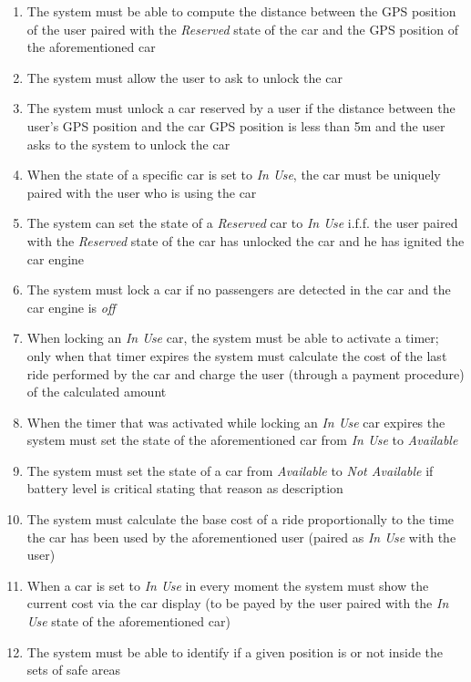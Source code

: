 \begin{description}
\begin{enumerate}[resume*]
  				\item The system must be able to compute the distance between the GPS position of
  				the user paired	with the \emph{Reserved} state of the car and the GPS position of the
  				aforementioned car
  				\item The system must allow the user to ask to unlock the car
  				\item The system must unlock a car reserved by a user if the distance between the user's GPS position and the car GPS position is less than 5m and the user asks to the system to unlock the car
  				\item When the state of a specific car is set to \emph{In Use}, the car must be
 	  			uniquely paired with the user who is using the car
  				\item The system can set the state of a \emph{Reserved} car to \emph{In Use} i.f.f.
  				the user paired with the \emph{Reserved} state of the car has unlocked the car and he
  				has ignited the car engine
  				\item The system must lock a car if no passengers are detected in the car and the car
  				engine is \emph{off}
  				\item When locking  an \emph{In Use} car, the system must be able to activate a timer;
  				only when that timer expires the system must calculate the cost of the last ride
  				performed by the car and charge the user (through a payment procedure) of the calculated
  				amount
  				\item When the timer that was activated while locking an \emph{In Use} car expires the system must
  				set the state of the aforementioned car from \emph{In Use} to \emph{Available}
  				\item The system must set the state of a car from \emph{Available}
  				to \emph{Not Available} if battery level is critical  stating that reason
  				as description
  				\item The system must calculate the base cost of a ride proportionally to the time
  				the car has been used by the aforementioned user (paired as \emph{In Use} with the
  				user)
  				\item When a car is set to \emph{In Use} in every moment the system must show the
  				current cost via the car display (to be payed by the user paired with the \emph{In Use}
  				state of the aforementioned car) 
  				\item The system must be able to identify if a given position is or not inside the sets
  				of safe areas

\end{enumerate}
\end{description}
